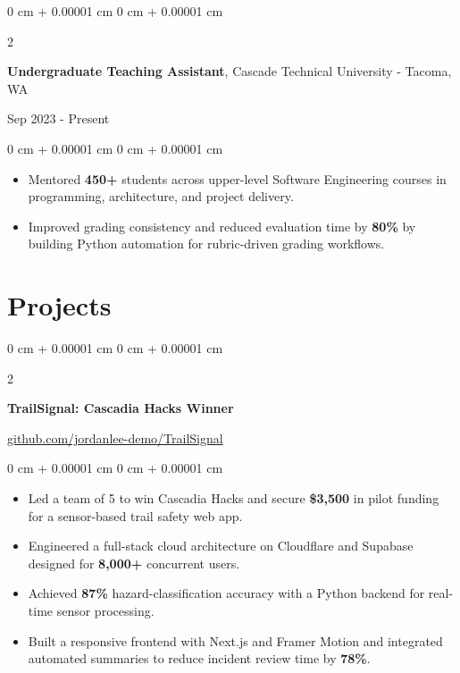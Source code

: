 \documentclass[10pt, letterpaper]{article}
\newenvironment{onecolentry}{
    \begin{adjustwidth}{
        0 cm + 0.00001 cm
    }{
        0 cm + 0.00001 cm
    }
}{
    \end{adjustwidth}
}
\newenvironment{twocolentry}[2][]{
    \onecolentry
    \def\secondColumn{#2}
    \setcolumnwidth{\fill, 6 cm}
    \begin{paracol}{2}
}{
    \switchcolumn \raggedleft \secondColumn
    \end{paracol}
    \endonecolentry
}
\begin{document}
    \vspace{0.10 cm}

    \begin{twocolentry}{Sep 2023 - Present}
        \textbf{Undergraduate Teaching Assistant}, Cascade Technical University - Tacoma, WA
    \end{twocolentry}

   \vspace{0.10 cm}
    \begin{onecolentry}
        \begin{itemize}[leftmargin=2em, itemsep=1pt, parsep=0pt, topsep=0pt, partopsep=0pt]
            \item Mentored \textbf{450+} students across upper-level Software Engineering courses in programming, architecture, and project delivery.
            \item Improved grading consistency and reduced evaluation time by \textbf{80\%} by building Python automation for rubric-driven grading workflows.
        \end{itemize}
    \end{onecolentry}

    \vspace{0.10 cm}
    \section{Projects}

    \begin{twocolentry}{\href{https://github.com/jordanlee-demo/TrailSignal}{github.com/jordanlee-demo/TrailSignal}}
        \textbf{TrailSignal: Cascadia Hacks Winner}
    \end{twocolentry}

    \vspace{0.10 cm}
    \begin{onecolentry}
        \begin{itemize}[leftmargin=2em, itemsep=1pt, parsep=0pt, topsep=0pt, partopsep=0pt]
            \item Led a team of 5 to win Cascadia Hacks and secure \textbf{\$3,500} in pilot funding for a sensor-based trail safety web app.
            \item Engineered a full-stack cloud architecture on Cloudflare and Supabase designed for \textbf{8,000+} concurrent users.
            \item Achieved \textbf{87\%} hazard-classification accuracy with a Python backend for real-time sensor processing.
            \item Built a responsive frontend with Next.js and Framer Motion and integrated automated summaries to reduce incident review time by \textbf{78\%}.
        \end{itemize}
    \end{onecolentry}
\end{document}
